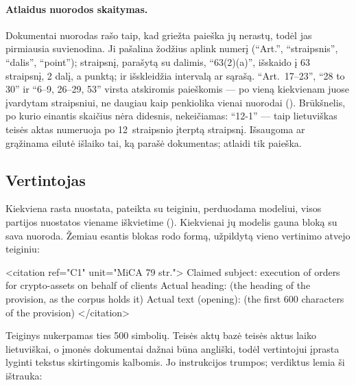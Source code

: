 \paragraph{Atlaidus nuorodos skaitymas.} Dokumentai nuorodas rašo taip, kad griežta paieška jų
nerastų, todėl  jas pirmiausia suvienodina. Ji pašalina žodžius aplink
numerį (\enquote{Art.}, \enquote{straipsnis}, \enquote{dalis}, \enquote{point}); straipsnį,
parašytą su dalimis, \enquote{63(2)(a)}, išskaido į 63 straipsnį, 2 dalį, a punktą; ir
išskleidžia intervalą ar sąrašą. \enquote{Art.~17--23}, \enquote{28 to 30} ir \enquote{6--9,
26--29, 53} virsta atskiromis paieškomis --- po vieną kiekvienam juose įvardytam
straipsniui, ne daugiau kaip penkiolika vienai nuorodai (). Brūkšnelis, po kurio
einantis skaičius nėra didesnis, nekeičiamas: \enquote{12-1} --- taip lietuviškas teisės aktas
numeruoja po 12~straipsnio įterptą straipsnį. Išsaugoma ar grąžinama eilutė
išlaiko tai, ką parašė dokumentas; atlaidi tik paieška.

\subsection{Vertintojas}\label{sec:company:judge}

Kiekviena rasta nuostata, pateikta su teiginiu, perduodama modeliui, visos partijos nuostatos
viename iškvietime (). Kiekvienai jų modelis gauna bloką su sava nuoroda. Žemiau
esantis blokas rodo formą, užpildytą vieno vertinimo atvejo teiginiu:

\begin{codeblock}
<citation ref="C1" unit="MiCA 79 str.">
Claimed subject: execution of orders for crypto-assets on behalf of clients
Actual heading: (the heading of the provision, as the corpus holds it)
Actual text (opening): (the first 600 characters of the provision)
</citation>
\end{codeblock}

Teiginys nukerpamas ties 500 simbolių. Teisės aktų bazė teisės aktus laiko lietuviškai, o
įmonės dokumentai dažnai būna angliški, todėl vertintojui įprasta lyginti tekstus skirtingomis kalbomis.
Jo instrukcijos trumpos; verdiktus lemia ši ištrauka:

